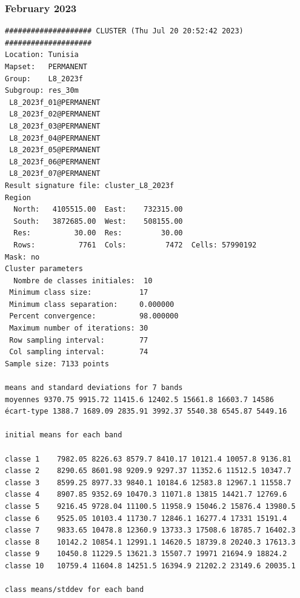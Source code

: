 \documentclass[land,article,submit,pdftex,moreauthors]{Definitions/mdpi}
\begin{document}
\subsubsection[\appendixname~\thesubsubsection]{February 2023}
\begin{scriptsize}
\begin{verbatim}
#################### CLUSTER (Thu Jul 20 20:52:42 2023) ####################
Location: Tunisia
Mapset:   PERMANENT
Group:    L8_2023f
Subgroup: res_30m
 L8_2023f_01@PERMANENT
 L8_2023f_02@PERMANENT
 L8_2023f_03@PERMANENT
 L8_2023f_04@PERMANENT
 L8_2023f_05@PERMANENT
 L8_2023f_06@PERMANENT
 L8_2023f_07@PERMANENT
Result signature file: cluster_L8_2023f
Region
  North:   4105515.00  East:    732315.00
  South:   3872685.00  West:    508155.00
  Res:          30.00  Res:         30.00
  Rows:          7761  Cols:         7472  Cells: 57990192
Mask: no
Cluster parameters
  Nombre de classes initiales: 	10
 Minimum class size:           17
 Minimum class separation:     0.000000
 Percent convergence:          98.000000
 Maximum number of iterations: 30
 Row sampling interval:        77
 Col sampling interval:        74
Sample size: 7133 points

means and standard deviations for 7 bands
moyennes 9370.75 9915.72 11415.6 12402.5 15661.8 16603.7 14586
écart-type 1388.7 1689.09 2835.91 3992.37 5540.38 6545.87 5449.16

initial means for each band

classe 1    7982.05 8226.63 8579.7 8410.17 10121.4 10057.8 9136.81
classe 2    8290.65 8601.98 9209.9 9297.37 11352.6 11512.5 10347.7
classe 3    8599.25 8977.33 9840.1 10184.6 12583.8 12967.1 11558.7
classe 4    8907.85 9352.69 10470.3 11071.8 13815 14421.7 12769.6
classe 5    9216.45 9728.04 11100.5 11958.9 15046.2 15876.4 13980.5
classe 6    9525.05 10103.4 11730.7 12846.1 16277.4 17331 15191.4
classe 7    9833.65 10478.8 12360.9 13733.3 17508.6 18785.7 16402.3
classe 8    10142.2 10854.1 12991.1 14620.5 18739.8 20240.3 17613.3
classe 9    10450.8 11229.5 13621.3 15507.7 19971 21694.9 18824.2
classe 10   10759.4 11604.8 14251.5 16394.9 21202.2 23149.6 20035.1

class means/stddev for each band


\end{verbatim}
\end{scriptsize}
\end{document}
